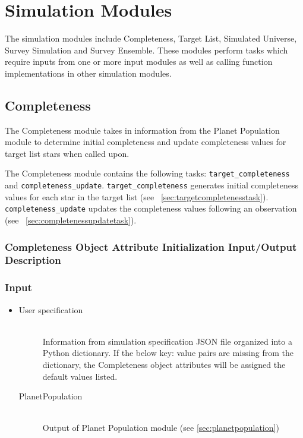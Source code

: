 \documentclass[cleanfoot]{asme2ej}
\begin{document}

\section{Simulation Modules}
The simulation modules include Completeness, Target List, Simulated Universe, Survey Simulation and Survey Ensemble. These modules perform tasks which require inputs from one or more input modules as well as calling function implementations in other simulation modules.


\subsection{Completeness}\label{sec:completeness}
The Completeness module takes in information from the Planet Population module to determine initial completeness and update completeness values for target list stars when called upon.

The Completeness module contains the following tasks: \verb+target_completeness+ and \verb+completeness_update+. \verb+target_completeness+ generates initial completeness values for each star in the target list (see ~\ref{sec:targetcompletenesstask}). \verb+completeness_update+ updates the completeness values following an observation (see ~\ref{sec:completenessupdatetask}).

\subsubsection{Completeness Object Attribute Initialization Input/Output Description}

\subsubsection*{Input}
\begin{itemize}
    \item 
    \begin{description}
        \item[User specification] \hfill \\
        Information from simulation specification JSON file organized into a Python dictionary. If the below key: value pairs are missing from the dictionary, the Completeness object attributes will be assigned the default values listed.
        \item[PlanetPopulation] \hfill \\
        Output of Planet Population module (see \ref{sec:planetpopulation})
    \end{description}
    
\end{itemize}
\end{document}
